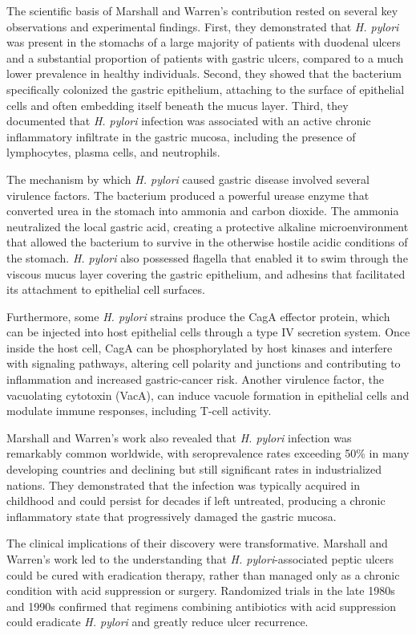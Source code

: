 The scientific basis of Marshall and Warren's contribution rested on several key observations and experimental findings. First, they demonstrated that \textit{H. pylori} was present in the stomachs of a large majority of patients with duodenal ulcers and a substantial proportion of patients with gastric ulcers, compared to a much lower prevalence in healthy individuals. Second, they showed that the bacterium specifically colonized the gastric epithelium, attaching to the surface of epithelial cells and often embedding itself beneath the mucus layer. Third, they documented that \textit{H. pylori} infection was associated with an active chronic inflammatory infiltrate in the gastric mucosa, including the presence of lymphocytes, plasma cells, and neutrophils.

The mechanism by which \textit{H. pylori} caused gastric disease involved several virulence factors. The bacterium produced a powerful urease enzyme that converted urea in the stomach into ammonia and carbon dioxide. The ammonia neutralized the local gastric acid, creating a protective alkaline microenvironment that allowed the bacterium to survive in the otherwise hostile acidic conditions of the stomach. \textit{H. pylori} also possessed flagella that enabled it to swim through the viscous mucus layer covering the gastric epithelium, and adhesins that facilitated its attachment to epithelial cell surfaces.

Furthermore, some \textit{H. pylori} strains produce the CagA effector protein, which can be injected into host epithelial cells through a type IV secretion system. Once inside the host cell, CagA can be phosphorylated by host kinases and interfere with signaling pathways, altering cell polarity and junctions and contributing to inflammation and increased gastric-cancer risk. Another virulence factor, the vacuolating cytotoxin (VacA), can induce vacuole formation in epithelial cells and modulate immune responses, including T-cell activity.

Marshall and Warren's work also revealed that \textit{H. pylori} infection was remarkably common worldwide, with seroprevalence rates exceeding 50\% in many developing countries and declining but still significant rates in industrialized nations. They demonstrated that the infection was typically acquired in childhood and could persist for decades if left untreated, producing a chronic inflammatory state that progressively damaged the gastric mucosa.

The clinical implications of their discovery were transformative. Marshall and Warren's work led to the understanding that \textit{H. pylori}-associated peptic ulcers could be cured with eradication therapy, rather than managed only as a chronic condition with acid suppression or surgery. Randomized trials in the late 1980s and 1990s confirmed that regimens combining antibiotics with acid suppression could eradicate \textit{H. pylori} and greatly reduce ulcer recurrence.


